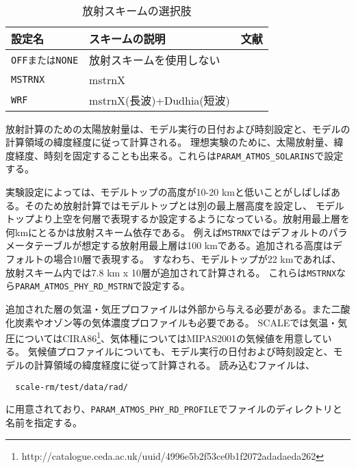 \\

\begin{table}[h]
\begin{center}
  \caption{放射スキームの選択肢}
  \label{tab:nml_atm_rd}
  \begin{tabularx}{150mm}{lXX} \hline
    \rowcolor[gray]{0.9}  設定名 & スキームの説明 & 文献\\ \hline
      \verb|OFFまたはNONE| & 放射スキームを使用しない & \\
      \verb|MSTRNX|       & mstrnX & \citet{sekiguchi_2008} \\
      \verb|WRF|          & mstrnX(長波)+Dudhia(短波) & \citet{dudhia_1989} \\
    \hline
  \end{tabularx}
\end{center}
\end{table}

放射計算のための太陽放射量は、モデル実行の日付および時刻設定と、モデルの計算領域の緯度経度に従って計算される。
理想実験のために、太陽放射量、緯度経度、時刻を固定することも出来る。これらは\verb|PARAM_ATMOS_SOLARINS|で設定する。


実験設定によっては、モデルトップの高度が10-20 kmと低いことがしばしばある。そのため放射計算ではモデルトップとは別の最上層高度を設定し、
モデルトップより上空を何層で表現するか設定するようになっている。放射用最上層を何kmにとるかは放射スキーム依存である。
例えば\verb|MSTRNX|ではデフォルトのパラメータテーブルが想定する放射用最上層は100 kmである。追加される高度はデフォルトの場合10層で表現する。
すなわち、モデルトップが22 kmであれば、放射スキーム内では7.8 km x 10層が追加されて計算される。
これらは\verb|MSTRNX|なら\verb|PARAM_ATMOS_PHY_RD_MSTRN|で設定する。

追加された層の気温・気圧プロファイルは外部から与える必要がある。また二酸化炭素やオゾン等の気体濃度プロファイルも必要である。
SCALEでは気温・気圧についてはCIRA86\footnote{http://catalogue.ceda.ac.uk/uuid/4996e5b2f53ce0b1f2072adadaeda262}\citep{CSR_2006}、気体種についてはMIPAS2001\citep{Remedios_2007}の気候値を用意している。
気候値プロファイルについても、モデル実行の日付および時刻設定と、モデルの計算領域の緯度経度に従って計算される。
読み込むファイルは、
\begin{verbatim}
  scale-rm/test/data/rad/
\end{verbatim}
に用意されており、\verb|PARAM_ATMOS_PHY_RD_PROFILE|でファイルのディレクトリと名前を指定する。

